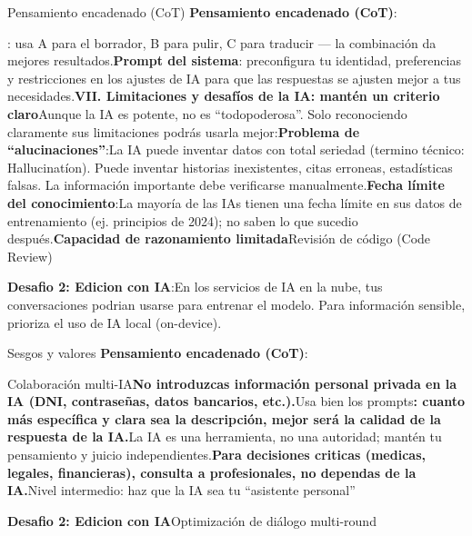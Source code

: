 
\begin{tcbinfo}{Pensamiento encadenado (CoT)}
\textbf{Pensamiento encadenado (CoT)}:

: usa A para el borrador, B para pulir, C para traducir — la combinación da mejores resultados.\textbf{Prompt del sistema}: preconfigura tu identidad, preferencias y restricciones en los ajustes de IA para que las respuestas se ajusten mejor a tus necesidades.\textbf{VII. Limitaciones y desafíos de la IA: mantén un criterio claro}Aunque la IA es potente, no es “todopoderosa”. Solo reconociendo claramente sus limitaciones podrás usarla mejor:\textbf{Problema de “alucinaciones”}:La IA puede inventar datos con total seriedad (termino técnico: Hallucinatíon). Puede inventar historias inexistentes, citas erroneas, estadísticas falsas. La información importante debe verificarse manualmente.\textbf{Fecha límite del conocimiento}:La mayoría de las IAs tienen una fecha límite en sus datos de entrenamiento (ej. principios de 2024); no saben lo que sucedio después.\textbf{Capacidad de razonamiento limitada}Revisión de código (Code Review)

\textbf{Desafio 2: Edicion con IA}:En los servicios de IA en la nube, tus conversaciones podrian usarse para entrenar el modelo. Para información sensible, prioriza el uso de IA local (on-device).

\end{tcbinfo}

\begin{tcbinfo}{Sesgos y valores}
\textbf{Pensamiento encadenado (CoT)}:

Colaboración multi-IA\textbf{No introduzcas información personal privada en la IA (DNI, contraseñas, datos bancarios, etc.).}Usa bien los prompts\textbf{: cuanto más específica y clara sea la descripción, mejor será la calidad de la respuesta de la IA.}La IA es una herramienta, no una autoridad; mantén tu pensamiento y juicio independientes.\textbf{Para decisiones criticas (medicas, legales, financieras), consulta a profesionales, no dependas de la IA.}Nivel intermedio: haz que la IA sea tu “asistente personal”

\textbf{Desafio 2: Edicion con IA}Optimización de diálogo multi-round

\end{tcbinfo}

